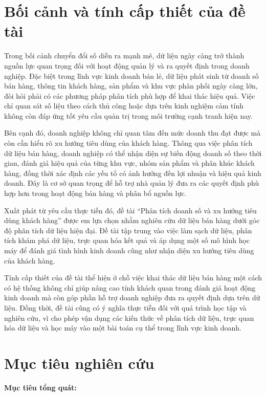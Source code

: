 \section{Bối cảnh và tính cấp thiết của đề tài}

Trong bối cảnh chuyển đổi số diễn ra mạnh mẽ, dữ liệu ngày càng trở thành nguồn lực quan trọng đối với hoạt động quản lý và ra quyết định trong doanh nghiệp. Đặc biệt trong lĩnh vực kinh doanh bán lẻ, dữ liệu phát sinh từ doanh số bán hàng, thông tin khách hàng, sản phẩm và khu vực phân phối ngày càng lớn, đòi hỏi phải có các phương pháp phân tích phù hợp để khai thác hiệu quả. Việc chỉ quan sát số liệu theo cách thủ công hoặc dựa trên kinh nghiệm cảm tính không còn đáp ứng tốt yêu cầu quản trị trong môi trường cạnh tranh hiện nay.

Bên cạnh đó, doanh nghiệp không chỉ quan tâm đến mức doanh thu đạt được mà còn cần hiểu rõ xu hướng tiêu dùng của khách hàng. Thông qua việc phân tích dữ liệu bán hàng, doanh nghiệp có thể nhận diện sự biến động doanh số theo thời gian, đánh giá hiệu quả của từng khu vực, nhóm sản phẩm và phân khúc khách hàng, đồng thời xác định các yếu tố có ảnh hưởng đến lợi nhuận và hiệu quả kinh doanh. Đây là cơ sở quan trọng để hỗ trợ nhà quản lý đưa ra các quyết định phù hợp hơn trong hoạt động bán hàng và phân bổ nguồn lực.

Xuất phát từ yêu cầu thực tiễn đó, đề tài ``Phân tích doanh số và xu hướng tiêu dùng khách hàng'' được em lựa chọn nhằm nghiên cứu dữ liệu bán hàng dưới góc độ phân tích dữ liệu hiện đại. Đề tài tập trung vào việc làm sạch dữ liệu, phân tích khám phá dữ liệu, trực quan hóa kết quả và áp dụng một số mô hình học máy để đánh giá tình hình kinh doanh cũng như nhận diện xu hướng tiêu dùng của khách hàng.

Tính cấp thiết của đề tài thể hiện ở chỗ việc khai thác dữ liệu bán hàng một cách có hệ thống không chỉ giúp nâng cao tính khách quan trong đánh giá hoạt động kinh doanh mà còn góp phần hỗ trợ doanh nghiệp đưa ra quyết định dựa trên dữ liệu. Đồng thời, đề tài cũng có ý nghĩa thực tiễn đối với quá trình học tập và nghiên cứu, vì cho phép vận dụng các kiến thức về phân tích dữ liệu, trực quan hóa dữ liệu và học máy vào một bài toán cụ thể trong lĩnh vực kinh doanh.

\section{Mục tiêu nghiên cứu}

\textbf{Mục tiêu tổng quát:}

